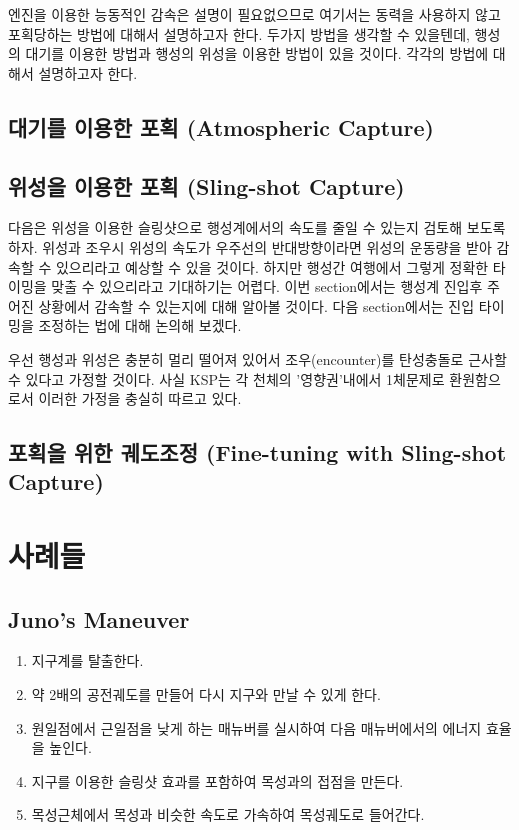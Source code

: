 \documentclass[9pt]{amsbook}
\begin{document}
엔진을 이용한 능동적인 감속은 설명이 필요없으므로 여기서는 동력을 사용하지 않고 포획당하는 방법에 대해서 설명하고자 한다. 두가지 방법을 생각할 수 있을텐데, 행성의 대기를 이용한 방법과 행성의 위성을 이용한 방법이 있을 것이다. 각각의 방법에 대해서 설명하고자 한다.
\section{대기를 이용한 포획 (Atmospheric Capture)}
\section{위성을 이용한 포획 (Sling-shot Capture)}
다음은 위성을 이용한 슬링샷으로 행성계에서의 속도를 줄일 수 있는지 검토해 보도록 하자. 위성과 조우시 위성의 속도가 우주선의 반대방향이라면 위성의 운동량을 받아 감속할 수 있으리라고 예상할 수 있을 것이다. 하지만 행성간 여행에서 그렇게 정확한 타이밍을 맞출 수 있으리라고 기대하기는 어렵다. 이번 section에서는 행성계 진입후 주어진 상황에서 감속할 수 있는지에 대해 알아볼 것이다. 다음 section에서는 진입 타이밍을 조정하는 법에 대해 논의해 보겠다.

우선 행성과 위성은 충분히 멀리 떨어져 있어서 조우(encounter)를 탄성충돌로 근사할 수 있다고 가정할 것이다. 사실 KSP는 각 천체의 '영향권'내에서 1체문제로 환원함으로서 이러한 가정을 충실히 따르고 있다.
\section{포획을 위한 궤도조정 (Fine-tuning with Sling-shot Capture)}

\chapter{사례들}
\section{Juno's Maneuver}
\begin{enumerate}
\item 지구계를 탈출한다.
\item 약 2배의 공전궤도를 만들어 다시 지구와 만날 수 있게 한다.
\item 원일점에서 근일점을 낮게 하는 매뉴버를 실시하여 다음 매뉴버에서의 에너지 효율을 높인다.
\item 지구를 이용한 슬링샷 효과를 포함하여 목성과의 접점을 만든다.
\item 목성근체에서 목성과 비슷한 속도로 가속하여 목성궤도로 들어간다.
\end{enumerate}
\end{document}
